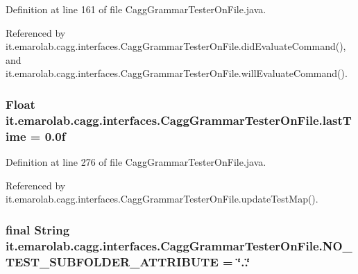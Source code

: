 Definition at line 161 of file Cagg\-Grammar\-Tester\-On\-File.\-java.



Referenced by it.\-emarolab.\-cagg.\-interfaces.\-Cagg\-Grammar\-Tester\-On\-File.\-did\-Evaluate\-Command(), and it.\-emarolab.\-cagg.\-interfaces.\-Cagg\-Grammar\-Tester\-On\-File.\-will\-Evaluate\-Command().

\hypertarget{classit_1_1emarolab_1_1cagg_1_1interfaces_1_1CaggGrammarTesterOnFile_a4213d4b2622ad45ea32fe421d21f2cb4}{
\subsubsection[{last\-Time}]{\setlength{\rightskip}{0pt plus 5cm}Float it.\-emarolab.\-cagg.\-interfaces.\-Cagg\-Grammar\-Tester\-On\-File.\-last\-Time = 0.\-0f\hspace{0.3cm}{\ttfamily [private]}}}\label{classit_1_1emarolab_1_1cagg_1_1interfaces_1_1CaggGrammarTesterOnFile_a4213d4b2622ad45ea32fe421d21f2cb4}


Definition at line 276 of file Cagg\-Grammar\-Tester\-On\-File.\-java.



Referenced by it.\-emarolab.\-cagg.\-interfaces.\-Cagg\-Grammar\-Tester\-On\-File.\-update\-Test\-Map().

\hypertarget{classit_1_1emarolab_1_1cagg_1_1interfaces_1_1CaggGrammarTesterOnFile_adda7ad6a98ec9c05d1b7e1043ef271da}{
\subsubsection[{N\-O\-\_\-\-T\-E\-S\-T\-\_\-\-S\-U\-B\-F\-O\-L\-D\-E\-R\-\_\-\-A\-T\-T\-R\-I\-B\-U\-T\-E}]{\setlength{\rightskip}{0pt plus 5cm}final String it.\-emarolab.\-cagg.\-interfaces.\-Cagg\-Grammar\-Tester\-On\-File.\-N\-O\-\_\-\-T\-E\-S\-T\-\_\-\-S\-U\-B\-F\-O\-L\-D\-E\-R\-\_\-\-A\-T\-T\-R\-I\-B\-U\-T\-E = \char`\"{}..\char`\"{}\hspace{0.3cm}{\ttfamily [static]}}}\label{classit_1_1emarolab_1_1cagg_1_1interfaces_1_1CaggGrammarTesterOnFile_adda7ad6a98ec9c05d1b7e1043ef271da}


